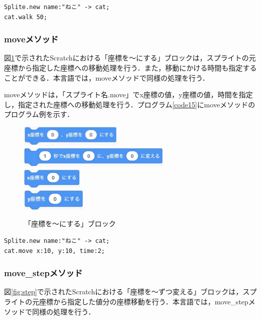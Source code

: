 \documentclass[10pt,a4j]{ltjsarticle}
\begin{document}
\begin{lstlisting}[caption=walkメソッドのプログラム例, label=code14]
Splite.new name:"ねこ" -> cat;
cat.walk 50; 
\end{lstlisting}

\subsubsection{moveメソッド}
図\ref{fig:move}で示されたScratchにおける「座標を〜にする」ブロックは，スプライトの元座標から指定した座標への移動処理を行う．また，移動にかける時間も指定することができる．本言語では，moveメソッドで同様の処理を行う．

moveメソッドは，「スプライト名.move」でx座標の値，y座標の値，時間を指定し，指定された座標への移動処理を行う．プログラム\ref{code15}にmoveメソッドのプログラム例を示す．

\begin{figure}[H]
  \centering
  \includegraphics[height=10mm]{images/move_x_y.pdf} \\
  \includegraphics[height=10mm]{images/move_x_y_time.pdf} \\
  \includegraphics[height=10mm]{images/move_x.pdf} \\
  \includegraphics[height=10mm]{images/move_y.pdf} 
  \caption{「座標を〜にする」ブロック}
  \label{fig:move}
\end{figure}

\begin{lstlisting}[caption=moveメソッドのプログラム例, label=code15]
Splite.new name:"ねこ" -> cat;
cat.move x:10, y:10, time:2; 
\end{lstlisting}

\subsubsection{move\_stepメソッド}
図\ref{fig:step}で示されたScratchにおける「座標を〜ずつ変える」ブロックは，スプライトの元座標から指定した値分の座標移動を行う．本言語では，move\_stepメソッドで同様の処理を行う．
\end{document}
